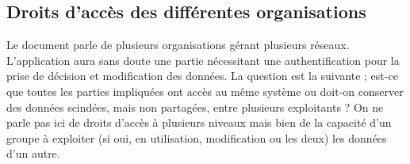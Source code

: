 \documentclass[a4paper, 11pt]{article}
\begin{document}
    \subsection*{Droits d'accès des différentes organisations}
    Le document parle de plusieurs organisations gérant plusieurs réseaux. L'application aura sans doute une partie nécessitant une authentification pour la prise de décision et modification des données. La question est la suivante ; est-ce que toutes les parties impliquées ont accès au même système ou doit-on conserver des données scindées, mais non partagées, entre plusieurs exploitants ? On ne parle pas ici de droits d'accès à plusieurs niveaux mais bien de la capacité d'un groupe à exploiter (si oui, en utilisation, modification ou les deux) les données d'un autre.
\end{document}
